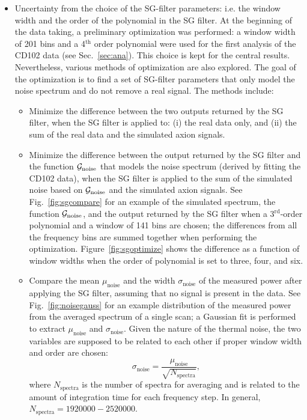 \begin{itemize}
\item Uncertainty from the choice of the SG-filter parameters: i.e.  
the window width and the order of the polynomial in the SG filter. At the 
beginning of the data taking, a preliminary optimization was performed: a 
window width of 201 bins and a 4$^\text{th}$ order polynomial were used for 
the first analysis of the CD102 data (see Sec.~\ref{sec:ana}). 
This choice is kept for the central results. 
Nevertheless, various methods of optimization are also explored. The goal 
of the optimization is to find a set of SG-filter parameters that only 
model the noise spectrum and do not remove a real signal. 
The methods include:
\begin{itemize}
 \item Minimize the difference between the two outputs returned by the SG 
filter, when the SG filter is applied to: (i) the real data only, and (ii) 
the sum of the real data and the simulated axion signals. 
 \item Minimize the difference between the output returned by the 
 SG filter and the function ${\cal G}_\text{noise}$ 
that models the noise spectrum (derived by fitting the CD102 data), 
when the SG filter is applied to the sum of the simulated noise based on 
${\cal G}_\text{noise}$ and the simulated axion signals. 
See Fig.~\ref{fig:sgcompare} for an example of the 
simulated spectrum, the function ${\cal G}_\text{noise}$, and the 
output returned by 
 the SG filter when a 3$^\text{rd}$-order polynomial and a window of 141 
 bins are chosen; the differences from all the frequency bins are summed 
 together when performing the optimization.
 Figure~\ref{fig:sgoptimize} shows the difference 
as a function of window widths when the order of polynomial is 
 set to three, four, and six. 
 \item Compare the mean $\mu_\text{noise}$ and the width $\sigma_\text{noise}$ 
of the measured power after applying the SG filter, 
assuming that no signal is present in the 
data. See Fig.~\ref{fig:noisegauss} for an example distribution 
of the measured power from the averaged spectrum of a 
single scan; %
a Gaussian fit is performed to extract 
$\mu_\text{noise}$ and $\sigma_\text{noise}$. Given the nature of the 
thermal noise, the two variables are supposed to be related to 
each other if proper window width and order are chosen:
\begin{equation*} 
\sigma_\text{noise} = \frac{\mu_\text{noise}}{\sqrt{N_\text{spectra}}},
\end{equation*}
where $N_\text{spectra}$ is the number of spectra for averaging and 
is related to the amount of integration time for each frequency step. In 
general, $N_\text{spectra}=1920000-2520000$. 
\end{itemize}


\end{itemize}

